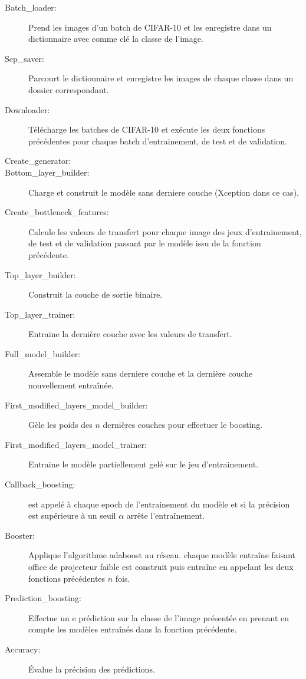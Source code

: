 \documentclass[11 pt]{article}
\begin{document}
\begin{appendices}
  \begin{description}
    \item[Batch\_loader:] Prend les images d'un batch de CIFAR-10 et les enregistre dans un dictionnaire avec comme clé la classe de l'image.
    \item[Sep\_saver:] Parcourt le dictionnaire et enregistre les images de chaque classe dans un dossier correspondant.
    \item[Downloader:] Télécharge les batches de CIFAR-10 et exécute les deux fonctions précédentes pour chaque batch d'entrainement, de test et de validation.
    \item[Create\_generator:]
    \item[Bottom\_layer\_builder:] Charge et construit le modèle sans derniere couche (Xception dans ce cas).
    \item[Create\_bottleneck\_features:] Calcule les valeurs de transfert pour chaque image des jeux d'entrainement, de test et de validation passant par le modèle issu de la fonction précédente.
    \item[Top\_layer\_builder:] Construit la couche de sortie binaire.
    \item[Top\_layer\_trainer:] Entraine la dernière couche avec les valeurs de transfert.
    \item[Full\_model\_builder:] Assemble le modèle sans derniere couche et la dernière couche nouvellement entraînée.
    \item[First\_modified\_layers\_model\_builder:] Gèle les poids des $n$ dernières couches pour effectuer le boosting.
    \item[First\_modified\_layers\_model\_trainer:] Entraine le modèle partiellement gelé sur le jeu d'entrainement.
    \item[Callback\_boosting:] est appelé à chaque epoch de l'entrainement du modèle et si la précision est supérieure à un seuil $\alpha$ arrête l'entraînement.
    \item[Booster:] Applique l'algorithme adaboost au réseau. chaque modèle entraîne faisant office de projecteur faible est construit puis entraîne en appelant les deux fonctions précédentes $n$ fois.
    \item[Prediction\_boosting:] Effectue un e prédiction sur la classe de l'image présentée en prenant en compte les modèles entraînés dans la fonction précédente.
    \item[Accuracy:] Évalue la précision des prédictions.
  \end{description}
\end{appendices}
\end{document}

